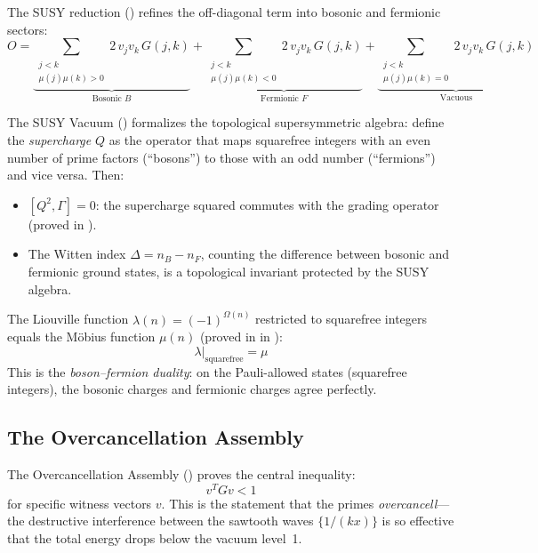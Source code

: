 The SUSY reduction () refines the off-diagonal
term into bosonic and fermionic sectors:
\begin{equation}
  O = \underbrace{\sum_{\substack{j < k \\ \mu(j)\mu(k) > 0}} 2\,v_j v_k\, G(j,k)}_{\text{Bosonic } B}
  + \underbrace{\sum_{\substack{j < k \\ \mu(j)\mu(k) < 0}} 2\,v_j v_k\, G(j,k)}_{\text{Fermionic } F}
  + \underbrace{\sum_{\substack{j < k \\ \mu(j)\mu(k) = 0}} 2\,v_j v_k\, G(j,k)}_{\text{Vacuous}}
  \label{eq:dbf}
\end{equation}

\begin{principle}
The SUSY Vacuum () formalizes the topological
supersymmetric algebra: define the \emph{supercharge} $Q$ as the
operator that maps squarefree integers with an even number of prime
factors (``bosons'') to those with an odd number (``fermions'')
and vice versa. Then:
\begin{itemize}
  \item $[Q^2, \Gamma] = 0$: the supercharge squared commutes with
    the grading operator (proved in ).
  \item The Witten index $\Delta = n_B - n_F$, counting the difference
    between bosonic and fermionic ground states, is a topological
    invariant protected by the SUSY algebra.
\end{itemize}
The Liouville function $\lambda(n) = (-1)^{\Omega(n)}$ restricted to
squarefree integers equals the M\"obius function
$\mu(n)$ (proved in 
in ):
\[
  \lambda|_{\text{squarefree}} = \mu
\]
This is the \emph{boson--fermion duality}: on the Pauli-allowed states
(squarefree integers), the bosonic charges and fermionic charges agree
perfectly.
\end{principle}

\subsection{The Overcancellation Assembly}

The Overcancellation Assembly ()
proves the central inequality:
\begin{equation}
  v^T G v < 1
  \label{eq:overcancellation}
\end{equation}
for specific witness vectors $v$. This is the statement that the
primes \emph{overcancell}---the destructive interference between
the sawtooth waves $\{1/(kx)\}$ is so effective that the total
energy drops below the vacuum level~1.

